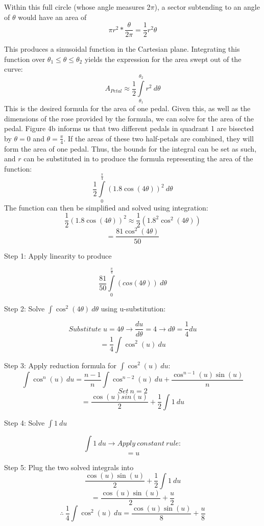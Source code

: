 \documentclass[11pt]{article}
\begin{document}
Within this full circle (whose angle measures 2$\pi$), a sector subtending to an angle of $\theta$ would have an area of \\[-2ex]
\[\pi r^2 * \frac{\theta}{2\pi} = \frac{1}{2}r^2\theta\]

This produces a sinusoidal function in the Cartesian plane. Integrating this function over $\theta_1 \leq \theta \leq \theta_2$ yields the expression for the area swept out of the curve:
\[\boxed{A_{Petal} \approx \frac{1}{2}\int\limits_{\theta_1}^{\theta_2} r^2 \ d\theta }\]
This is the desired formula for the area of one pedal. Given this, as well as the dimensions of the rose provided by the formula, we can solve for the area of the pedal. Figure 4b informs us that two different pedals in quadrant 1 are bisected by $\theta=0$ and $\theta=\frac{\pi}{4}$. If the areas of these two half-petals are combined, they will form the area of one pedal. Thus, the bounds for the integral can be set as such, and $r$ can be substituted in to produce the formula representing the area of the function: \\[-2ex]
\[\frac{1}{2}\int\limits_{0}^{\frac{\pi}{4}} (1.8\cos(4\theta))^2 \ d\theta \]
The function can then be simplified and solved using integration:
\[\frac{1}{2}(1.8\cos(4\theta))^2 \approx \frac{1}{2}(1.8^2\cos^2(4\theta))\]
\[=\frac{81\cos^2(4\theta)}{50}\]


Step 1: Apply linearity to produce

\[\frac{81}{50}\int\limits_{0}^{\frac{\pi}{4}} (cos(4\theta)) \ d\theta \]

Step 2: Solve $\int \cos^2(4\theta) \ d\theta$ using u-substitution:

\[Substitute\; u=4\theta \rightarrow \frac{du}{d\theta} = 4 \rightarrow d\theta = \frac{1}{4}du\]
\[=\boxed{\frac{1}{4}\int \cos^2(u)\ du}\]

Step 3: Apply reduction formula for $\int \cos^2(u) \ du$:
\[\int \cos^n(u) \ du=\frac{n-1}{n}\int \cos^{n-2}(u) \ du + \frac{\cos^{n-1}(u)\sin(u)}{n}\]
\[Set \ n=2\]
\[=\frac{\cos(u)sin(u)}{2} + \frac{1}{2} \int 1 \ du\]

Step 4: Solve $\int 1 \ du$

\[\int 1 \ du \rightarrow Apply \ constant \ rule:\]
\[= \boxed{u}\]

Step 5: Plug the two solved integrals into
\[\frac{\cos(u)\sin(u)}{2} + \frac{1}{2}\int 1 \ du\]
\[= \frac{\cos(u)\sin(u)}{2} + \frac{u}{2} \]
\[\therefore \ \frac{1}{4}\int \cos^2(u)\ du = \frac{\cos(u)\sin(u)}{8} + \frac{u}{8} \]
\end{document}
